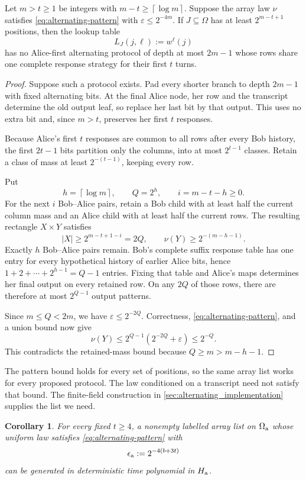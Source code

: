 \documentclass[11pt]{article} \usepackage[utf8]{inputenc}
\theoremstyle{plain} \newtheorem{theorem}{Theorem}[section]
\newtheorem{corollary}[corollary]{Corollary} \aliascntresetthe{corollary}
\theoremstyle{definition} \newaliascnt{definition}{theorem}
\newcommand{\ceil}[1]{\left\lceil#1\right\rceil}
\begin{document}
\begin{lemma}\label{yao:small-bias-escape}
Let $m>t\ge1$ be integers with $m-t\ge\ceil{\log m}$. Suppose the array law
$\nu$ satisfies \cref{eq:alternating-pattern} with
$\varepsilon\le2^{-4m}$. If $J\subseteq\Omega$ has at least
$2^{m-t+1}$ positions, then the lookup table
\[
L_J(j,\ell):=w^\ell(j)
\]
has no Alice-first alternating protocol of depth at most $2m-1$ whose
rows share one complete response strategy for their first $t$ turns.
\end{lemma}
\begin{proof}
Suppose such a protocol exists. Pad every shorter branch to depth $2m-1$ with
fixed alternating bits. At the final Alice node, her row and the transcript
determine the old output leaf, so replace her last bit by that output. This
uses no extra bit and, since $m>t$, preserves her first $t$ responses.

Because Alice's first $t$ responses
are common to all rows after every Bob history, the first $2t-1$ bits partition
only the columns, into at most $2^{t-1}$ classes. Retain a class of mass at
least $2^{-(t-1)}$, keeping every row.

Put
\[
h=\ceil{\log m},\qquad Q=2^h,\qquad i=m-t-h\ge0.
\]
For the next $i$ Bob--Alice pairs,
retain a Bob child with at least half the current column mass and an Alice
child with at least half the current rows. The resulting rectangle $X\times Y$
satisfies
\[
|X|\ge2^{m-t+1-i}=2Q,\qquad
\nu(Y)\ge2^{-(m-h-1)}.
\]
Exactly $h$ Bob--Alice pairs remain. Bob's complete suffix response table has
one entry for every hypothetical history of earlier Alice bits, hence
$1+2+\cdots+2^{h-1}=Q-1$ entries. Fixing that table and Alice's maps determines
her final output on every retained row. On any $2Q$ of those rows, there are
therefore at most $2^{Q-1}$ output patterns.

Since $m\le Q<2m$, we have $\varepsilon\le2^{-2Q}$. Correctness,
\cref{eq:alternating-pattern}, and a union bound now give
\[
\nu(Y)\le2^{Q-1}(2^{-2Q}+\varepsilon)\le2^{-Q}.
\]
This contradicts the retained-mass bound because
$Q\ge m>m-h-1$.
\end{proof}

The pattern bound holds for every set of positions, so the same array list
works for every proposed protocol. The law conditioned on a transcript need
not satisfy that bound. The finite-field construction in
\cref{sec:alternating_implementation} supplies the list we need.

\begin{corollary}\label{yao:array-list}
For every fixed $t\ge4$, a nonempty labelled array list on $\Omega_{\rm a}$
whose uniform law satisfies \cref{eq:alternating-pattern} with
\[
\epsilon_{\rm a}:=2^{-4(b+3t)}
\]
can be generated in deterministic time polynomial in $H_{\rm a}$.
\end{corollary}
\end{document}

